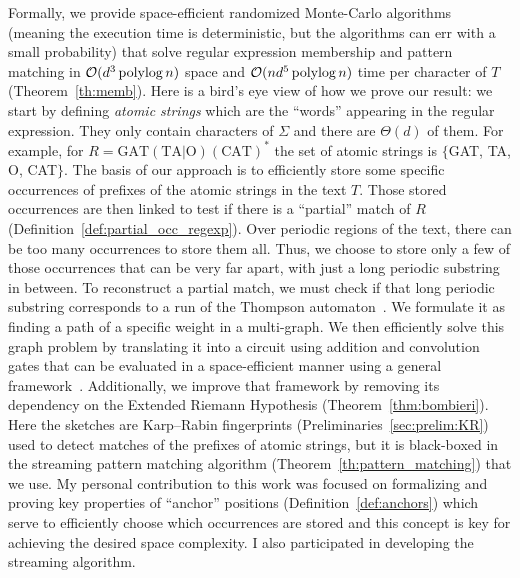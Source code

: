 Formally, we provide space-efficient randomized Monte-Carlo algorithms (meaning the execution time is deterministic, but the algorithms can err with a small probability) that solve regular expression membership and pattern matching in $\mathcal{O}(d^3\operatorname{polylog} n)$ space and $\mathcal{O}(nd^5\operatorname{polylog} n)$ time per character of $T$ (Theorem~\ref{th:memb}).
%
Here is a bird's eye view of how we prove our result: we start by defining \emph{atomic strings} which are the ``words'' appearing in the regular expression. They only contain characters of $\Sigma$ and there are $\Theta(d)$ of them. For example, for $R= \mathrm{GAT}(\mathrm{TA} | \mathrm{O})(\mathrm{CAT})^*$ the set of atomic strings is $\{$GAT, TA, O, CAT$\}$.
%
The basis of our approach is to efficiently store some specific occurrences of prefixes of the atomic strings in the text $T$. Those stored occurrences are then linked to test if there is a “partial” match of $R$ (Definition~\ref*{def:partial_occ_regexp}).
Over periodic regions of the text, there can be too many occurrences to store them all.
Thus, we choose to store only a few of those occurrences that can be very far apart, with just a long periodic substring in between. To reconstruct a partial match, we must check if that long periodic substring corresponds to a run of the Thompson automaton~\cite{Thompson_automaton}. We formulate it as finding a path of a specific weight in a multi-graph. We then efficiently solve this graph problem by translating it into a circuit using addition and convolution gates that can be evaluated in a space-efficient manner using a general framework~\cite{LokshtanovN10,Bringmann17}. Additionally, we improve that framework by removing its dependency on the Extended Riemann Hypothesis (Theorem~\ref{thm:bombieri}). 
Here the sketches are Karp--Rabin fingerprints (Preliminaries~\ref{sec:prelim:KR}) used to detect matches of the prefixes of atomic strings, but it is black-boxed in the streaming pattern matching algorithm (Theorem~\ref{th:pattern_matching}) that we use.
My personal contribution to this work was focused on formalizing and proving key properties of ``anchor'' positions (Definition~\ref{def:anchors}) which serve to efficiently choose which occurrences are stored and this concept is key for achieving the desired space complexity. I also participated in developing the streaming algorithm.

